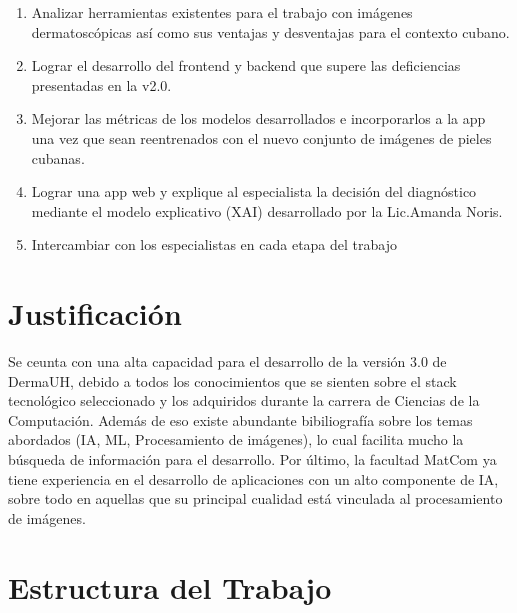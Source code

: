 \begin{enumerate}
    \item Analizar herramientas existentes para el trabajo con im\'agenes dermatosc\'opicas as\'i como sus ventajas y desventajas para el contexto cubano.
    \item Lograr el desarrollo del frontend y backend que supere las deficiencias presentadas en la v2.0.
    \item Mejorar las m\'etricas de los modelos desarrollados e incorporarlos a la app una vez que sean reentrenados con el nuevo conjunto de im\'agenes de pieles cubanas.
    \item Lograr una app web y explique al especialista la decisi\'on del diagn\'ostico mediante el modelo explicativo (XAI) desarrollado por la Lic.Amanda Noris.
    \item Intercambiar con los especialistas en cada etapa del trabajo
\end{enumerate}

\section{Justificaci\'on}
Se ceunta con una alta capacidad para el desarrollo de la versi\'on 3.0 de DermaUH, debido a todos 
los conocimientos que se sienten sobre el stack tecnol\'ogico seleccionado y los adquiridos durante 
la carrera de Ciencias de la Computaci\'on. Adem\'as de eso existe abundante bibiliograf\'ia sobre 
los temas abordados (IA, ML, Procesamiento de im\'agenes), lo cual facilita mucho la b\'usqueda de 
informaci\'on para el desarrollo. Por \'ultimo, la facultad MatCom ya tiene experiencia en el desarrollo
de aplicaciones con un alto componente de IA, sobre todo en aquellas que su principal cualidad
est\'a vinculada al procesamiento de im\'agenes.

\section{Estructura del Trabajo}
